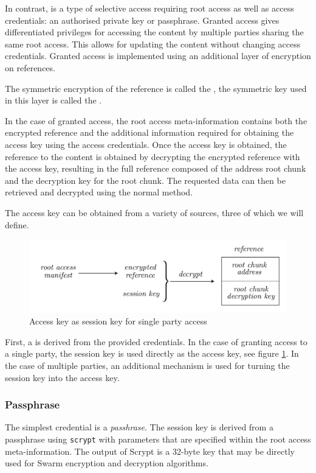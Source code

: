 In contrast,  is a type of selective access requiring root access as well as access credentials: an authorised private key or passphrase. Granted access gives differentiated privileges for accessing the content by multiple parties sharing the same root access. This allows for updating the content without changing access credentials. Granted access is implemented using an additional layer of encryption on references.

The symmetric encryption of the reference is called the , the symmetric key used in this layer is called the .

In the case of granted access, the root access meta-information contains both the encrypted reference and the additional information required for obtaining the access key using the access credentials. Once the access key is obtained, the reference to the content is obtained by decrypting the encrypted reference with the access key, resulting in the full reference composed of the address root chunk and the decryption key for the root chunk. The requested data can then be retrieved and decrypted using the normal method.

The access key can be obtained from a variety of sources, three of which we will define.

\begin{figure}[htbp]
\centering
\includegraphics[width=\textwidth]{fig/access-control-single-party.pdf}
\caption[Access key as session key for single party access  \statusyellow]{Access key as session key for single party access}
\label{fig:access-control-single-party}
\end{figure}

First, a  is derived from the provided credentials. In the case of granting access to a single party, the session key is used directly as the access key, see figure \ref{fig:access-control-single-party}. In the case of multiple parties, an additional mechanism is used for turning the session key into the access key.

\subsubsection{Passphrase}
The simplest credential is a \emph{passhrase}. The session key is derived from a passphrase using \lstinline{scrypt} with parameters that are specified within the root access meta-information. The output of Scrypt is a 32-byte key that may be directly used for Swarm encryption and decryption algorithms.

